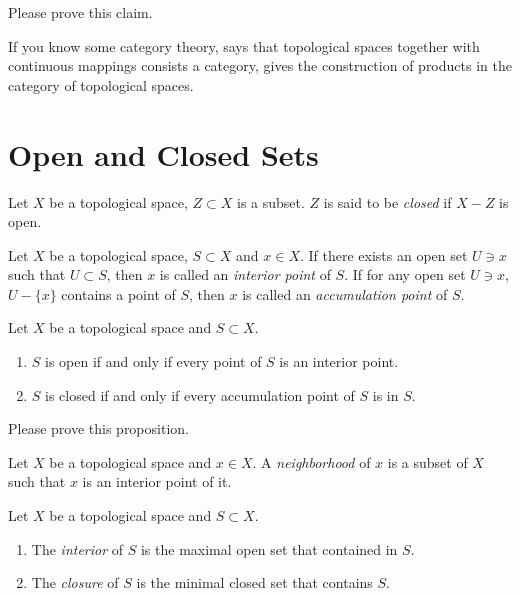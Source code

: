 Please prove this claim.

\begin{rem}
    If you know some category theory,  says that topological spaces together with continuous mappings consists a category,  gives the construction of products in the category of topological spaces.
\end{rem}

\section{Open and Closed Sets}

\begin{defn}
    Let $X$ be a topological space, $Z\subset X$ is a subset.
    $Z$ is said to be \emph{closed} if $X-Z$ is open.
\end{defn}

\begin{defn}
    Let $X$ be a topological space, $S\subset X$ and $x\in X$.
    If there exists an open set $U\ni x$ such that $U\subset S$, then $x$ is called an \emph{interior point} of $S$.
    If for any open set $U\ni x$, $U-\{x\}$ contains a point of $S$, then $x$ is called an \emph{accumulation point} of $S$.
\end{defn}

\begin{prop}
    Let $X$ be a topological space and $S\subset X$.
    \begin{enumerate}[(1)]
        \item $S$ is open if and only if every point of $S$ is an interior point.
        \item $S$ is closed if and only if every accumulation point of $S$ is in $S$.
    \end{enumerate}
\end{prop}

Please prove this proposition.

\begin{defn}
    Let $X$ be a topological space and $x\in X$.
    A \emph{neighborhood} of $x$ is a subset of $X$ such that $x$ is an interior point of it.
\end{defn}

\begin{defn}
    Let $X$ be a topological space and $S\subset X$.
    \begin{enumerate}[(1)]
        \item The \emph{interior} of $S$ is the maximal open set that contained in $S$.
        \item The \emph{closure} of $S$ is the minimal closed set that contains $S$.
    \end{enumerate}
\end{defn}

